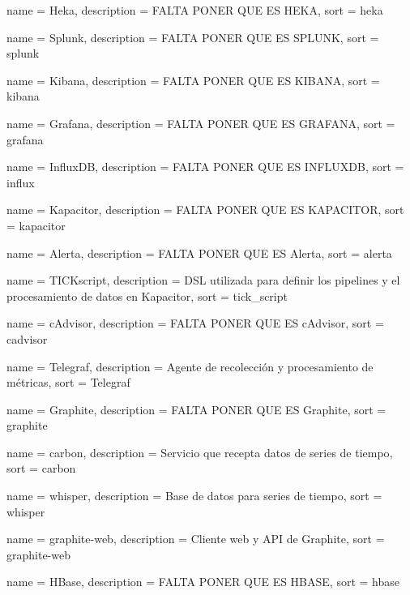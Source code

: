  {
  name        = {Heka},
  description = {FALTA PONER QUE ES HEKA},
  sort        = {heka}
}

 {
  name        = {Splunk},
  description = {FALTA PONER QUE ES SPLUNK},
  sort        = {splunk}
}

 {
  name        = {Kibana},
  description = {FALTA PONER QUE ES KIBANA},
  sort        = {kibana}
}

 {
  name        = {Grafana},
  description = {FALTA PONER QUE ES GRAFANA},
  sort        = {grafana}
}

 {
  name        = {InfluxDB},
  description = {FALTA PONER QUE ES INFLUXDB},
  sort        = {influx}
}

 {
  name        = {Kapacitor},
  description = {FALTA PONER QUE ES KAPACITOR},
  sort        = {kapacitor}
}

 {
  name        = {Alerta},
  description = {FALTA PONER QUE ES Alerta},
  sort        = {alerta}
}

 {
  name        = {TICKscript},
  description =
    {DSL utilizada para definir los pipelines y el procesamiento de datos en
    Kapacitor},
  sort        = {tick_script}
}

 {
  name        = {cAdvisor},
  description = {FALTA PONER QUE ES cAdvisor},
  sort        = {cadvisor}
}

 {
  name        = {Telegraf},
  description = {Agente de recolección y procesamiento de métricas},
  sort        = {Telegraf}
}

 {
  name        = {Graphite},
  description = {FALTA PONER QUE ES Graphite},
  sort        = {graphite}
}

 {
  name        = {carbon},
  description = {Servicio que recepta datos de series de tiempo},
  sort        = {carbon}
}

 {
  name        = {whisper},
  description = {Base de datos para series de tiempo},
  sort        = {whisper}
}

 {
  name        = {graphite-web},
  description = {Cliente web y API de Graphite},
  sort        = {graphite-web}
}

 {
  name        = {HBase},
  description = {FALTA PONER QUE ES HBASE},
  sort        = {hbase}
}

